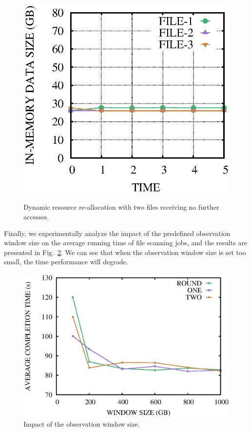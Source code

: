 \begin{figure}[!htbp]
{\begin{minipage}[b]{0.47\linewidth}
        \includegraphics[scale=0.41]{figures/3-2-maxmin-1000-ds.eps}
        \label{fig:3-2-b}
        \end{minipage}
    }
    \caption{Dynamic resource re-allocation with two files receiving no further accesses.}
    \label{fig:3-2}
\end{figure}

Finally, we experimentally analyze the impact of the predefined observation window size on the average running time of file scanning jobs, and the results are presented in Fig.~\ref{fig:time_windowsize}.  We can see that when the observation window size is set too small, the time performance will degrade.

\begin{figure}[!htbp]
\centering
\includegraphics[scale=0.41]{figures/window_size_time.eps}
\caption{Impact of the observation window size.}
\label{fig:time_windowsize}
\end{figure} 